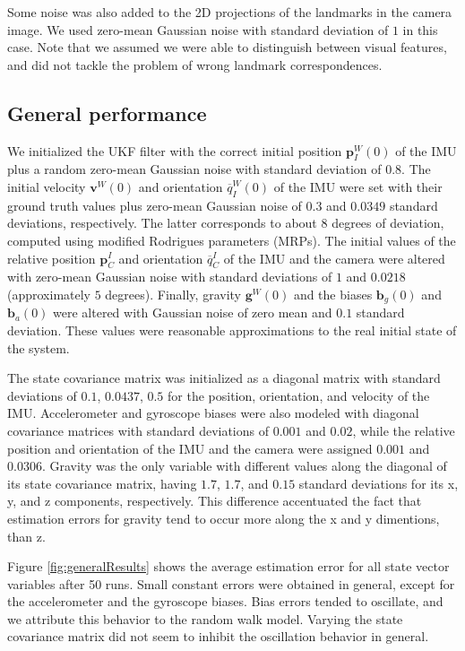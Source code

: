 \documentclass[letterpaper]{article}
\newcommand{\bb}[1]{\mathbf{#1}}
\begin{document}
Some noise was also added to the 2D projections of the landmarks in
the camera image. We used zero-mean Gaussian noise with
standard deviation of $1$ in this case. Note that we assumed we were able to
distinguish between visual features, and did not tackle the problem of
wrong landmark correspondences.

\subsection{General performance}

We initialized the UKF filter with the correct initial position
$\bb{p}_I^W(0)$ of the IMU plus a random zero-mean Gaussian noise with
standard deviation of $0.8$. The initial velocity $\bb{v}^W(0)$ and
orientation $\overline{q}_I^W(0)$ of the IMU were set with their
  ground truth values plus zero-mean Gaussian noise of $0.3$ and
  $0.0349$ standard deviations, respectively. The latter corresponds
  to about $8$ degrees of deviation, computed using modified Rodrigues
  parameters (MRPs). The initial values of the relative position
  $\bb{p}_C^I$ and orientation $\overline{q}_C^I$ of the IMU and the
  camera were altered with zero-mean Gaussian noise with standard
  deviations of $1$ and $0.0218$ (approximately $5$ degrees). Finally,
  gravity $\bb{g}^W(0)$ and the biases $\bb{b}_g(0)$ and $\bb{b}_a(0)$
  were altered with Gaussian noise of zero mean and $0.1$ standard
  deviation. These values were reasonable approximations to the real
  initial state of the system.

The state covariance matrix was initialized as a diagonal matrix with
standard deviations of $0.1$, $0.0437$, $0.5$ for the position,
orientation, and velocity of the IMU. Accelerometer and gyroscope
biases were also modeled with diagonal covariance matrices with
standard deviations of $0.001$ and $0.02$, while the relative position
and orientation of the IMU and the camera were assigned $0.001$ and
$0.0306$. Gravity was the only variable with different values along
the diagonal of its state covariance matrix, having $1.7$, $1.7$, and
$0.15$ standard deviations for its x, y, and z components,
respectively. This difference accentuated the fact that estimation
errors for gravity tend to occur more along the x and y dimentions, than z.

Figure \ref{fig:generalResults} shows the average estimation error for
all state vector variables after 50 runs. Small constant errors were
obtained in general, except for the accelerometer and the gyroscope
biases. Bias errors tended to oscillate, and we attribute this
behavior to the random walk model. Varying the state covariance matrix
did not seem to inhibit the oscillation behavior in general. 
\end{document}
